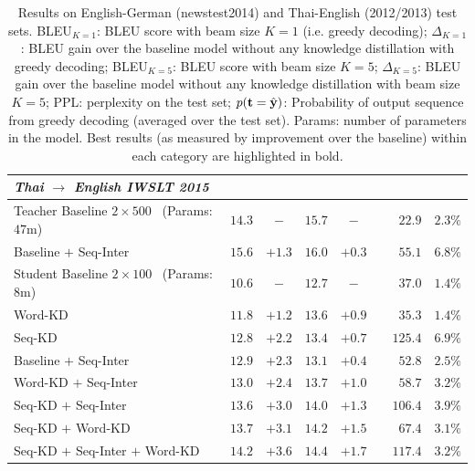 \documentclass[11pt,letterpaper]{article}
\begin{document}
\begin{table}[!ht]
\begin{tabular}{l c c  c c r r r }
\bottomrule
\toprule
\textit{Thai $\rightarrow$ English IWSLT 2015} \\ 
\midrule
Teacher Baseline $2 \times 500$ $\,$ (Params: $47$m) & $14.3$ &  $-$ & $15.7$&   $-$ &  & $22.9$ & $2.3\%$ \\
\hspace{4mm}  Baseline $+$ Seq-Inter   & $15.6$ & $+1.3$& $16.0$& $+0.3$& & $55.1$ &  $6.8\%$ \\
\midrule
Student Baseline $2 \times 100$ $\,$ (Params: $8$m) & $10.6$ & $-$ & $12.7$&   $-$ & & $37.0$ & $1.4\%$  \\
\hspace{4mm}  Word-KD   & $11.8$ & $+1.2$& $13.6$&  $+0.9$& & $35.3$ &  $1.4\%$\\
\hspace{4mm}  Seq-KD   & $12.8$ & $+2.2$& $13.4$& $+0.7$& & $125.4$ & $6.9\%$  \\
\hspace{4mm}  Baseline $+$ Seq-Inter   & $12.9$ & $+2.3$& $13.1$& $+0.4$& & $52.8$ & $2.5\%$  \\
\hspace{4mm} Word-KD $+$ Seq-Inter  & $13.0$ & $+2.4$& $13.7$& $+1.0$ & & $58.7$ &  $3.2\%$  \\
\hspace{4mm}  Seq-KD $+$ Seq-Inter   & $13.6$ & $+3.0$& $14.0$&  $+1.3$& & $106.4$ & $3.9\%$  \\
\hspace{4mm}  Seq-KD $+$ Word-KD   & $13.7$ & $+3.1 $& $14.2$&  $+1.5$ && $67.4$& $3.1\%$ \\
\hspace{4mm} Seq-KD $+$ Seq-Inter $+$ Word-KD   & $14.2$ & $+\mathbf{3.6}$& $14.4$& $+\mathbf{1.7}$ & & $117.4$ & $3.2\%$ \\
\bottomrule
\end{tabular}
\caption{Results on English-German (newstest2014) and Thai-English (2012/2013) test sets.
BLEU$_{K=1}$: BLEU score with beam size $K=1$ (i.e. greedy
decoding); $\Delta_{K=1}$: BLEU gain over the baseline model without any knowledge distillation with greedy decoding;  BLEU$_{K=5}$: BLEU score with beam size $K=5$;
 $\Delta_{K=5}$: BLEU gain over the baseline model without any knowledge distillation with beam size $K = 5$; 
PPL: perplexity on the test set; $p(\mathbf{t} = \hat{\mathbf{y}})$: Probability of output sequence from greedy decoding 
(averaged over the test set). Params: number of parameters in the model. Best results (as measured by improvement over the baseline)
within each category are highlighted in bold.}
\end{table}
\end{document}
